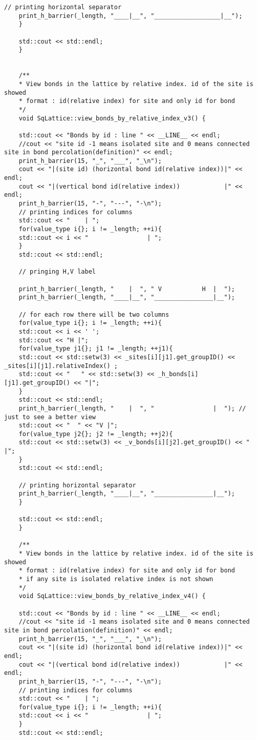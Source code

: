 \begin{lstlisting}[style=CStyle]
	// printing horizontal separator
	print_h_barrier(_length, "____|__", "__________________|__");
	}
	
	std::cout << std::endl;
	}
	
	
	/**
	* View bonds in the lattice by relative index. id of the site is showed
	* format : id(relative index) for site and only id for bond
	*/
	void SqLattice::view_bonds_by_relative_index_v3() {
	
	std::cout << "Bonds by id : line " << __LINE__ << endl;
	//cout << "site id -1 means isolated site and 0 means connected site in bond percolation(definition)" << endl;
	print_h_barrier(15, "_", "___", "_\n");
	cout << "|(site id) (horizontal bond id(relative index))|" << endl;
	cout << "|(vertical bond id(relative index))            |" << endl;
	print_h_barrier(15, "-", "---", "-\n");
	// printing indices for columns
	std::cout << "    | ";
	for(value_type i{}; i != _length; ++i){
	std::cout << i << "                | ";
	}
	std::cout << std::endl;
	
	// pringing H,V label
	
	print_h_barrier(_length, "    |  ", " V           H  |  ");
	print_h_barrier(_length, "____|__", "________________|__");
	
	// for each row there will be two columns
	for(value_type i{}; i != _length; ++i){
	std::cout << i << ' ';
	std::cout << "H |";
	for(value_type j1{}; j1 != _length; ++j1){
	std::cout << std::setw(3) << _sites[i][j1].get_groupID() << _sites[i][j1].relativeIndex() ;
	std::cout << "   " << std::setw(3) << _h_bonds[i][j1].get_groupID() << "|";
	}
	std::cout << std::endl;
	print_h_barrier(_length, "    |  ", "                |  "); // just to see a better view
	std::cout << "  " << "V |";
	for(value_type j2{}; j2 != _length; ++j2){
	std::cout << std::setw(3) << _v_bonds[i][j2].get_groupID() << "               |";
	}
	std::cout << std::endl;
	
	// printing horizontal separator
	print_h_barrier(_length, "____|__", "________________|__");
	}
	
	std::cout << std::endl;
	}
	
	/**
	* View bonds in the lattice by relative index. id of the site is showed
	* format : id(relative index) for site and only id for bond
	* if any site is isolated relative index is not shown
	*/
	void SqLattice::view_bonds_by_relative_index_v4() {
	
	std::cout << "Bonds by id : line " << __LINE__ << endl;
	//cout << "site id -1 means isolated site and 0 means connected site in bond percolation(definition)" << endl;
	print_h_barrier(15, "_", "___", "_\n");
	cout << "|(site id) (horizontal bond id(relative index))|" << endl;
	cout << "|(vertical bond id(relative index))            |" << endl;
	print_h_barrier(15, "-", "---", "-\n");
	// printing indices for columns
	std::cout << "    | ";
	for(value_type i{}; i != _length; ++i){
	std::cout << i << "                | ";
	}
	std::cout << std::endl;
	

\end{lstlisting}
